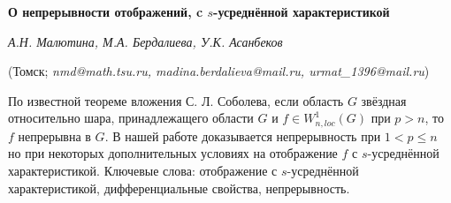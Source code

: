 \begin{center}
    {\bf О непрерывности отображений, c $s$-усреднённой характеристикой}

    {\it А.Н. Малютина, М.А. Бердалиева, У.К. Асанбеков}

    (Томск; {\it nmd@math.tsu.ru, madina.berdalieva@mail.ru, urmat\_1396@mail.ru})
\end{center}

По известной теореме вложения С. Л. Соболева, если область $G$ звёздная относительно шара, принадлежащего области $G$ и $f \in W^{1}_{n,loc}(G)$ при $p>n$, то $f$ непрерывна в $G$. В нашей работе доказывается непрерывность при $1<p\leq n$ но при некоторых дополнительных условиях на отображение $f$ с $s$-усреднённой характеристикой.
Ключевые слова: отображение с $s$-усреднённой характеристикой, дифференциальные свойства, непрерывность.


